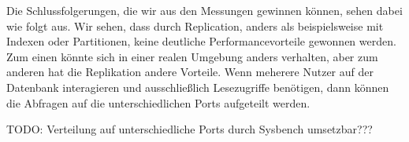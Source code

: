 Die Schlussfolgerungen, die wir aus den Messungen gewinnen können, sehen dabei wie folgt aus.
Wir sehen, dass durch Replication, anders als beispielsweise mit Indexen oder Partitionen, keine deutliche Performancevorteile gewonnen werden.
Zum einen könnte sich in einer realen Umgebung anders verhalten, aber zum anderen hat die Replikation andere Vorteile.
Wenn meherere Nutzer auf der Datenbank interagieren und ausschließlich Lesezugriffe benötigen, dann können die Abfragen auf die unterschiedlichen Ports aufgeteilt werden.

TODO: Verteilung auf unterschiedliche Ports durch Sysbench umsetzbar???
